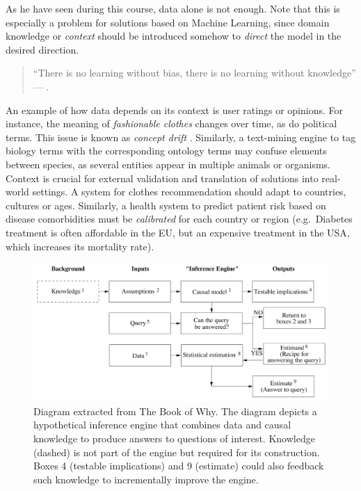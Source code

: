 \documentclass[
]{book}
\begin{document}
As he have seen during this course, data alone is not enough. Note that this is especially a problem for solutions based on Machine Learning, since domain knowledge or \emph{context} should be introduced somehow to \emph{direct} the model in the desired direction.

\begin{quote}
``There is no learning without bias, there is no learning without knowledge'' --- \citep{skansi2020guide} \citep{domingos2015master}.
\end{quote}

An example of how data depends on its context is user ratings or opinions. For instance, the meaning of \emph{fashionable clothes} changes over time, as do political terms. This issue is known as \emph{concept drift} \citep{kubat2017introduction}. Similarly, a text-mining engine to tag biology terms with the corresponding ontology terms may confuse elements between species, as several entities appear in multiple animals or organisms. Context is crucial for external validation and translation of solutions into real-world settings. A system for clothes recommendation should adapt to countries, cultures or ages. Similarly, a health system to predict patient risk based on disease comorbidities must be \emph{calibrated} for each country or region (e.g.~Diabetes treatment is often affordable in the EU, but an expensive treatment in the USA, which increases its mortality rate).

\begin{figure}

{\centering \includegraphics[width=0.9\linewidth]{Figures/jpearl_inference_engine} 

}

\caption{Diagram extracted from The Book of Why. The diagram depicts a hypothetical inference engine that combines data and causal knowledge to produce answers to questions of interest. Knowledge (dashed) is not part of the engine but required for its construction. Boxes 4 (testable implications) and 9 (estimate) could also feedback such knowledge to incrementally improve the engine.}\label{fig:inference-engine}
\end{figure}
\end{document}
